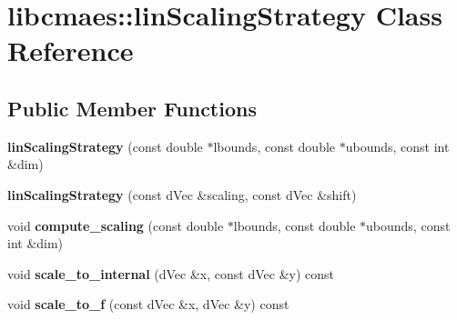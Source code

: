 \hypertarget{classlibcmaes_1_1linScalingStrategy}{\section{libcmaes\-:\-:lin\-Scaling\-Strategy Class Reference}
\label{classlibcmaes_1_1linScalingStrategy}
}
\subsection*{Public Member Functions}
\begin{DoxyCompactItemize}
\item 
\hypertarget{classlibcmaes_1_1linScalingStrategy_a02a64849f458cf8a440501d9e041b3e9}{{\bfseries lin\-Scaling\-Strategy} (const double $\ast$lbounds, const double $\ast$ubounds, const int \&dim)}\label{classlibcmaes_1_1linScalingStrategy_a02a64849f458cf8a440501d9e041b3e9}

\item 
\hypertarget{classlibcmaes_1_1linScalingStrategy_af798cb677f9f0ede111252c1ee05ab08}{{\bfseries lin\-Scaling\-Strategy} (const d\-Vec \&scaling, const d\-Vec \&shift)}\label{classlibcmaes_1_1linScalingStrategy_af798cb677f9f0ede111252c1ee05ab08}

\item 
\hypertarget{classlibcmaes_1_1linScalingStrategy_a043e908a7f3a7864c6a21ff5f041c48d}{void {\bfseries compute\-\_\-scaling} (const double $\ast$lbounds, const double $\ast$ubounds, const int \&dim)}\label{classlibcmaes_1_1linScalingStrategy_a043e908a7f3a7864c6a21ff5f041c48d}

\item 
\hypertarget{classlibcmaes_1_1linScalingStrategy_a6b111ef2e0f78c0f6a2cde92df7aa90e}{void {\bfseries scale\-\_\-to\-\_\-internal} (d\-Vec \&x, const d\-Vec \&y) const }\label{classlibcmaes_1_1linScalingStrategy_a6b111ef2e0f78c0f6a2cde92df7aa90e}

\item 
\hypertarget{classlibcmaes_1_1linScalingStrategy_a9ea06cf4d10c3015a154c763f88b862b}{void {\bfseries scale\-\_\-to\-\_\-f} (const d\-Vec \&x, d\-Vec \&y) const }\label{classlibcmaes_1_1linScalingStrategy_a9ea06cf4d10c3015a154c763f88b862b}

\end{DoxyCompactItemize}
